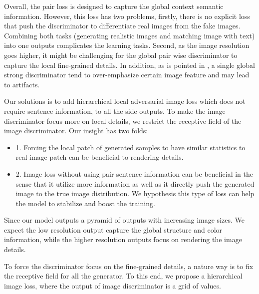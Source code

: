 \documentclass[10pt,twocolumn,letterpaper]{article}
\begin{document}
Overall, the pair loss is designed to capture the global context semantic information.  However, this loss has two problems, firstly,  there is no explicit loss that push the discriminator to differentiate real images from the fake images. Combining both tasks (generating realistic images and matching image with text) into one outputs complicates the learning tasks. Second,  as the image resolution goes higher, it might be challenging for the global pair wise discriminator to capture the local fine-grained details.  In addition, as is pointed in \cite{shrivastava2016learning}, a single global strong discriminator tend to over-emphasize certain image feature and may lead to artifacts. 


Our solutions is to add hierarchical local adversarial image loss which does not require sentence information, to all the side outputs. To make the image discriminator focus more on local details, we restrict the receptive field of the image discriminator.
Our insight has two folds:
\begin{itemize}
	\item 1. Forcing the local patch of generated samples to have similar statistics to real image patch can be beneficial to rendering details. %
	 
	\item 2. Image loss without using pair sentence information can be beneficial in the sense that it utilize more information as well as it directly push the generated image to the true image distribution. We hypothesis this type of loss can help the model to stabilize and boost the training. 
\end{itemize}
Since our model outputs a pyramid of outputs with increasing image sizes. 
We expect the low resolution output capture the global structure and color information, while the higher resolution outputs focus on rendering the image details. 

To force the discriminator focus on the fine-grained details, a nature way is to fix the receptive field for all the generator. To this end, we propose a hierarchical image loss, where the output of image  discriminator is a grid of values. 
\end{document}
